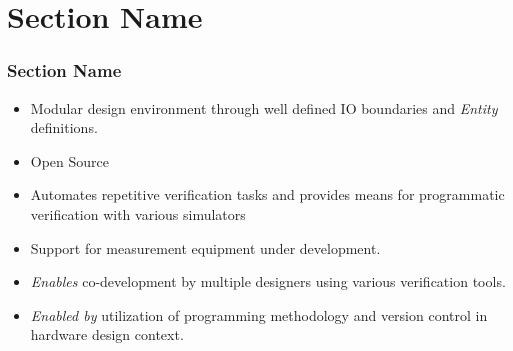 \documentclass[logo=bluequo,normaltitle]{aaltoslides}
\newcommand{\sectname}{Section Name}
\begin{document}
\section{\sectname}
\begin{frame}[t]
    \frametitle{\sectname}
    \begin{itemize}
        \item Modular design environment through well defined IO boundaries and
            \emph{Entity} definitions.
        \item Open Source
        \item Automates repetitive verification tasks and provides means for programmatic
            verification with various simulators
        \item Support for measurement equipment under development.
        \item \emph{Enables} co-development by multiple designers using various
            verification tools.
        \item \emph{Enabled by} utilization of programming methodology and
            version control in hardware design context.
    \end{itemize}
\end{frame}
\end{document}
